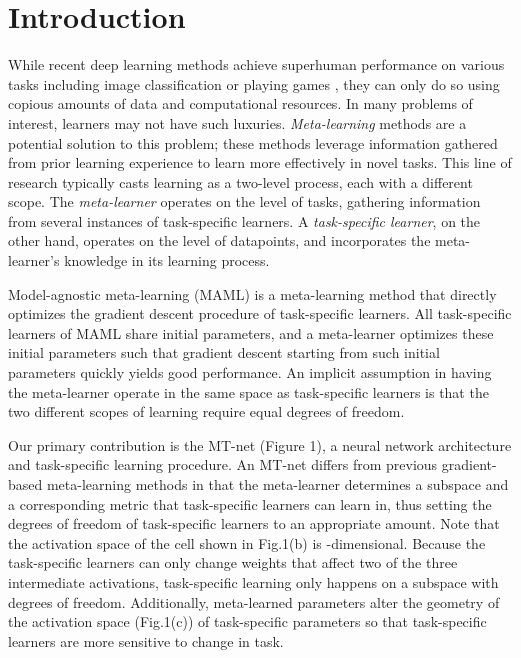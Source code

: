 \documentclass{article}
\newcommand{\0}{{\bf 0}}
\begin{document}
\section{Introduction}
\label{sec:introduction}

While recent deep learning methods achieve superhuman performance on various tasks including image classification 
\cite{Krizhevsky2012nips} or playing games \cite{MnihV2015nature}, they can only do so using copious amounts of data and computational resources.
In many problems of interest, learners may not have such luxuries.
\textit{Meta-learning} \cite{SchmidhuberJ87phd,SchmidhuberJ97mlj,ThrunS98book} methods are a potential solution to this problem; 
these methods leverage information gathered from prior learning experience to learn more effectively in novel tasks.
This line of research typically casts learning as a two-level process, each with a different scope.
The \emph{meta-learner} operates on the level of tasks, gathering information from several instances of task-specific learners.
A \emph{task-specific learner}, on the other hand, operates on the level of datapoints, and incorporates the meta-learner's knowledge in its learning process.

Model-agnostic meta-learning (MAML) \cite{FinnC2017icml} is a meta-learning method that directly optimizes the gradient descent procedure of task-specific learners.
All task-specific learners of MAML share initial parameters, and a meta-learner optimizes these initial parameters such that gradient descent 
starting from such initial parameters quickly yields good performance.
An implicit assumption in having the meta-learner operate in the same space as task-specific learners is that the two different scopes of learning
require equal degrees of freedom.

Our primary contribution is the MT-net (Figure 1), a neural network architecture and task-specific learning procedure.
An MT-net differs from previous gradient-based meta-learning methods in that the meta-learner determines a subspace and a corresponding metric 
that task-specific learners can learn in, thus setting the degrees of freedom of task-specific learners to an appropriate amount.
Note that the activation space of the cell shown in Fig.1(b) is -dimensional.
Because the task-specific learners can only change weights that affect two of the three intermediate activations, 
task-specific learning only happens on a subspace with  degrees of freedom.
Additionally, meta-learned parameters  alter the geometry of the activation space (Fig.1(c)) of task-specific parameters
so that task-specific learners are more sensitive to change in task.
\end{document}
